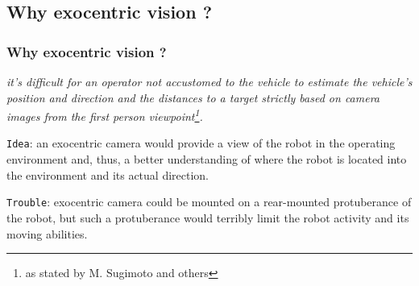 \subsection{Why exocentric vision ?}
\frame
{
  \frametitle{Why exocentric vision ?}
  
  \textit{it's difficult for an operator not accustomed to the vehicle
    to estimate the vehicle's position and direction and the distances to a target strictly
    based on camera images from the first person viewpoint\footnote{\tiny{as stated by M. Sugimoto and others}}.}
  \pause
  
  \vskip15pt

  \alert{\texttt{Idea}}: an exocentric camera would provide a view of the robot in the operating
  environment and, thus, a better understanding of where the robot is located into the
  environment and its actual direction. \\
  
  \pause
    
  \vskip5pt
  
  \alert{\texttt{Trouble}}: exocentric camera could be mounted on a rear-mounted protuberance of the robot,
  but such a protuberance would terribly limit the robot activity and its moving abilities.
  
}


